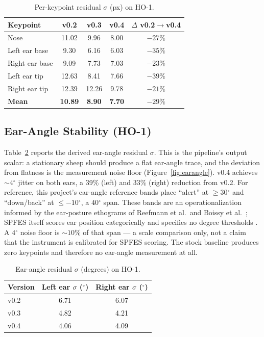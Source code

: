 \documentclass[11pt]{article}
\newcommand{\dgr}{\ensuremath{^{\circ}}}
\begin{document}
\begin{table}[t]
  \centering
  \caption{Per-keypoint residual $\sigma$ (px) on HO-1.}
  \label{tab:perkpt}
  \begin{tabular}{lcccc}
    \toprule
    Keypoint & v0.2 & v0.3 & v0.4 & $\Delta$ v0.2$\rightarrow$v0.4 \\
    \midrule
    Nose           & 11.02 & 9.96  & 8.00 & $-27\%$ \\
    Left ear base  & 9.30  & 6.16  & 6.03 & $-35\%$ \\
    Right ear base & 9.09  & 7.73  & 7.03 & $-23\%$ \\
    Left ear tip   & 12.63 & 8.41  & 7.66 & $-39\%$ \\
    Right ear tip  & 12.39 & 12.26 & 9.78 & $-21\%$ \\
    \midrule
    \textbf{Mean}  & \textbf{10.89} & \textbf{8.90} & \textbf{7.70} & \textbf{$-29\%$} \\
    \bottomrule
  \end{tabular}
\end{table}

\subsection{Ear-Angle Stability (HO-1)}
Table~\ref{tab:earangle} reports the derived ear-angle residual $\sigma$. This is
the pipeline's output scalar: a stationary sheep should produce a flat ear-angle
trace, and the deviation from flatness is the measurement noise floor
(Figure~\ref{fig:earangle}). v0.4 achieves ${\sim}4\dgr$ jitter on both ears, a
39\% (left) and 33\% (right) reduction from v0.2. For reference, this project's
ear-angle reference bands place ``alert'' at $\geq 30\dgr$ and ``down/back'' at
$\leq -10\dgr$, a $40\dgr$ span. These bands are an operationalization informed
by the ear-posture ethograms of Reefmann et al.\ and Boissy et al.\
\citep{reefmann2009,boissy2011}; SPFES itself scores ear position categorically
and specifies no degree thresholds \citep{mclennan2016}. A $4\dgr$ noise floor
is ${\sim}10\%$ of that span --- a scale comparison only, not a claim that the
instrument is calibrated for SPFES scoring. The stock baseline
produces zero keypoints and therefore no ear-angle measurement at all.

\begin{table}[t]
  \centering
  \caption{Ear-angle residual $\sigma$ (degrees) on HO-1.}
  \label{tab:earangle}
  \begin{tabular}{lcc}
    \toprule
    Version & Left ear $\sigma$ (\dgr) & Right ear $\sigma$ (\dgr) \\
    \midrule
    v0.2 & 6.71 & 6.07 \\
    v0.3 & 4.82 & 4.21 \\
    v0.4 & 4.06 & 4.09 \\
    \bottomrule
  \end{tabular}
\end{table}
\end{document}
